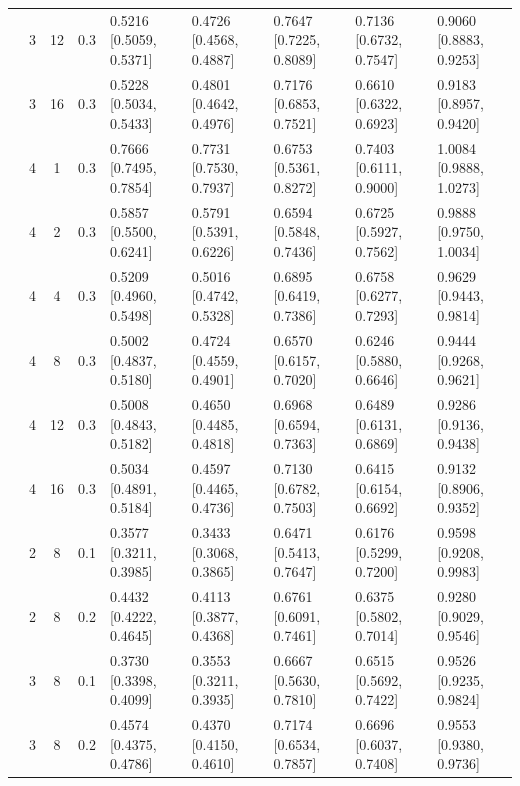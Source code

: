 \begin{tabular}{@{}cccclllll@{}}
 & 3 & 12 & 0.3 & 0.5216 {\tiny[0.5059, 0.5371]} & 0.4726 {\tiny[0.4568, 0.4887]} & 0.7647 {\tiny[0.7225, 0.8089]} & 0.7136 {\tiny[0.6732, 0.7547]} & 0.9060 {\tiny[0.8883, 0.9253]} \\
 & 3 & 16 & 0.3 & 0.5228 {\tiny[0.5034, 0.5433]} & 0.4801 {\tiny[0.4642, 0.4976]} & 0.7176 {\tiny[0.6853, 0.7521]} & 0.6610 {\tiny[0.6322, 0.6923]} & 0.9183 {\tiny[0.8957, 0.9420]} \\
 & 4 & 1 & 0.3 & 0.7666 {\tiny[0.7495, 0.7854]} & 0.7731 {\tiny[0.7530, 0.7937]} & 0.6753 {\tiny[0.5361, 0.8272]} & 0.7403 {\tiny[0.6111, 0.9000]} & 1.0084 {\tiny[0.9888, 1.0273]} \\
 & 4 & 2 & 0.3 & 0.5857 {\tiny[0.5500, 0.6241]} & 0.5791 {\tiny[0.5391, 0.6226]} & 0.6594 {\tiny[0.5848, 0.7436]} & 0.6725 {\tiny[0.5927, 0.7562]} & 0.9888 {\tiny[0.9750, 1.0034]} \\
 & 4 & 4 & 0.3 & 0.5209 {\tiny[0.4960, 0.5498]} & 0.5016 {\tiny[0.4742, 0.5328]} & 0.6895 {\tiny[0.6419, 0.7386]} & 0.6758 {\tiny[0.6277, 0.7293]} & 0.9629 {\tiny[0.9443, 0.9814]} \\
 & 4 & 8 & 0.3 & 0.5002 {\tiny[0.4837, 0.5180]} & 0.4724 {\tiny[0.4559, 0.4901]} & 0.6570 {\tiny[0.6157, 0.7020]} & 0.6246 {\tiny[0.5880, 0.6646]} & 0.9444 {\tiny[0.9268, 0.9621]} \\
 & 4 & 12 & 0.3 & 0.5008 {\tiny[0.4843, 0.5182]} & 0.4650 {\tiny[0.4485, 0.4818]} & 0.6968 {\tiny[0.6594, 0.7363]} & 0.6489 {\tiny[0.6131, 0.6869]} & 0.9286 {\tiny[0.9136, 0.9438]} \\
 & 4 & 16 & 0.3 & 0.5034 {\tiny[0.4891, 0.5184]} & 0.4597 {\tiny[0.4465, 0.4736]} & 0.7130 {\tiny[0.6782, 0.7503]} & 0.6415 {\tiny[0.6154, 0.6692]} & 0.9132 {\tiny[0.8906, 0.9352]} \\
 & 2 & 8 & 0.1 & 0.3577 {\tiny[0.3211, 0.3985]} & 0.3433 {\tiny[0.3068, 0.3865]} & 0.6471 {\tiny[0.5413, 0.7647]} & 0.6176 {\tiny[0.5299, 0.7200]} & 0.9598 {\tiny[0.9208, 0.9983]} \\
 & 2 & 8 & 0.2 & 0.4432 {\tiny[0.4222, 0.4645]} & 0.4113 {\tiny[0.3877, 0.4368]} & 0.6761 {\tiny[0.6091, 0.7461]} & 0.6375 {\tiny[0.5802, 0.7014]} & 0.9280 {\tiny[0.9029, 0.9546]} \\
 & 3 & 8 & 0.1 & 0.3730 {\tiny[0.3398, 0.4099]} & 0.3553 {\tiny[0.3211, 0.3935]} & 0.6667 {\tiny[0.5630, 0.7810]} & 0.6515 {\tiny[0.5692, 0.7422]} & 0.9526 {\tiny[0.9235, 0.9824]} \\
 & 3 & 8 & 0.2 & 0.4574 {\tiny[0.4375, 0.4786]} & 0.4370 {\tiny[0.4150, 0.4610]} & 0.7174 {\tiny[0.6534, 0.7857]} & 0.6696 {\tiny[0.6037, 0.7408]} & 0.9553 {\tiny[0.9380, 0.9736]} \\

\end{tabular}
